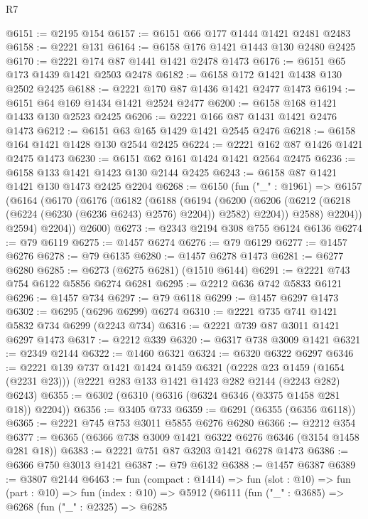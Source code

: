 \begin{lexlean}{R7}
\begin{coremodule}
@6151 := @2195 @154
@6157 := @6151 @66 @177 @1444 @1421 @2481 @2483
@6158 := @2221 @131
@6164 := @6158 @176 @1421 @1443 @130 @2480 @2425
@6170 := @2221 @174 @87 @1441 @1421 @2478 @1473
@6176 := @6151 @65 @173 @1439 @1421 @2503 @2478
@6182 := @6158 @172 @1421 @1438 @130 @2502 @2425
@6188 := @2221 @170 @87 @1436 @1421 @2477 @1473
@6194 := @6151 @64 @169 @1434 @1421 @2524 @2477
@6200 := @6158 @168 @1421 @1433 @130 @2523 @2425
@6206 := @2221 @166 @87 @1431 @1421 @2476 @1473
@6212 := @6151 @63 @165 @1429 @1421 @2545 @2476
@6218 := @6158 @164 @1421 @1428 @130 @2544 @2425
@6224 := @2221 @162 @87 @1426 @1421 @2475 @1473
@6230 := @6151 @62 @161 @1424 @1421 @2564 @2475
@6236 := @6158 @133 @1421 @1423 @130 @2144 @2425
@6243 := @6158 @87 @1421 @1421 @130 @1473 @2425 @2204
@6268 := @6150
    (fun ("_" : @1961) =>
    @6157
      (@6164
        (@6170
          (@6176
            (@6182
              (@6188
                (@6194
                  (@6200
                    (@6206 (@6212 (@6218 (@6224 (@6230 (@6236 @6243) @2576) @2204)) @2582) @2204))
                  @2588)
                @2204))
            @2594)
          @2204))
      @2600)
@6273 := @2343 @2194 @308 @755 @6124 @6136
@6274 := @79 @6119
@6275 := @1457 @6274
@6276 := @79 @6129
@6277 := @1457 @6276
@6278 := @79 @6135
@6280 := @1457 @6278 @1473
@6281 := @6277 @6280
@6285 := @6273 (@6275 @6281) (@1510 @6144)
@6291 := @2221 @743 @754 @6122 @5856 @6274 @6281
@6295 := @2212 @636 @742 @5833 @6121
@6296 := @1457 @734
@6297 := @79 @6118
@6299 := @1457 @6297 @1473
@6302 := @6295 (@6296 @6299) @6274
@6310 := @2221 @735 @741 @1421 @5832 @734 @6299 (@2243 @734)
@6316 := @2221 @739 @87 @3011 @1421 @6297 @1473
@6317 := @2212 @339
@6320 := @6317 @738 @3009 @1421
@6321 := @2349 @2144
@6322 := @1460 @6321
@6324 := @6320 @6322 @6297
@6346 := @2221
    @139
    @737
    @1421
    @1424
    @1459
    @6321
    (@2228 @23 @1459 (@1654 (@2231 @23)))
    (@2221 @283 @133 @1421 @1423 @282 @2144 (@2243 @282) @6243)
@6355 := @6302 (@6310 (@6316 (@6324 @6346 (@3375 @1458 @281 @18)) @2204))
@6356 := @3405 @733
@6359 := @6291 (@6355 (@6356 @6118))
@6365 := @2221 @745 @753 @3011 @5855 @6276 @6280
@6366 := @2212 @354
@6377 := @6365 (@6366 @738 @3009 @1421 @6322 @6276 @6346 (@3154 @1458 @281 @18))
@6383 := @2221 @751 @87 @3203 @1421 @6278 @1473
@6386 := @6366 @750 @3013 @1421
@6387 := @79 @6132
@6388 := @1457 @6387
@6389 := @3807 @2144
@6463 := fun (compact : @1414) =>
  fun (slot : @10) =>
  fun (part : @10) =>
  fun (index : @10) =>
  @5912
    (@6111
      (fun ("_" : @3685) =>
      @6268
        (fun ("_" : @2325) =>
        @6285

\end{coremodule}
\end{lexlean}
